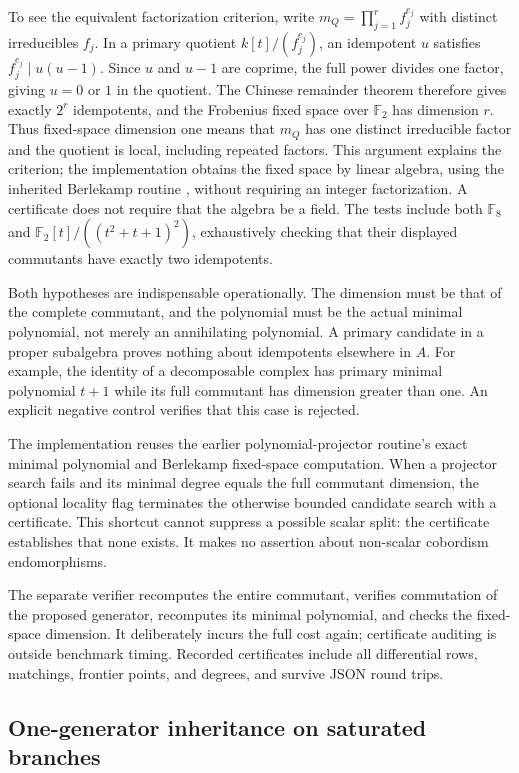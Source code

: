 To see the equivalent factorization criterion, write
$m_Q=\prod_{j=1}^r f_j^{e_j}$ with distinct irreducibles $f_j$.
In a primary quotient $k[t]/(f_j^{e_j})$, an idempotent $u$ satisfies
$f_j^{e_j}\mid u(u-1)$. Since $u$ and $u-1$ are coprime, the full
power divides one factor, giving $u=0$ or $1$ in the quotient.
The Chinese remainder theorem therefore gives exactly $2^r$ idempotents,
and the Frobenius fixed space over $\mathbb F_2$ has dimension $r$.
Thus fixed-space dimension one means that $m_Q$ has one distinct
irreducible factor and the quotient is local, including repeated factors.
This argument explains the criterion; the implementation obtains the
fixed space by linear algebra, using the inherited Berlekamp routine
\cite{berlekamp,projectors}, without requiring an integer factorization. A certificate
does not require that the algebra be a field. The tests include both
$\mathbb F_8$ and $\mathbb F_2[t]/((t^2+t+1)^2)$, exhaustively checking that
their displayed commutants have exactly two idempotents.

Both hypotheses are indispensable operationally. The dimension must be that
of the complete commutant, and the polynomial must be the actual minimal
polynomial, not merely an annihilating polynomial. A primary candidate in a
proper subalgebra proves nothing about idempotents elsewhere in $A$.
For example, the identity of a decomposable complex has primary minimal
polynomial $t+1$ while its full commutant has dimension greater than one.
An explicit negative control verifies that this case is rejected.

The implementation reuses the earlier polynomial-projector routine's exact
minimal polynomial and Berlekamp fixed-space computation. When a projector
search fails and its minimal degree equals the full commutant dimension,
the optional locality flag terminates the otherwise bounded candidate
search with a certificate. This shortcut cannot suppress a possible scalar
split: the certificate establishes that none exists. It makes no assertion
about non-scalar cobordism endomorphisms.

The separate verifier recomputes the entire commutant, verifies commutation
of the proposed generator, recomputes its minimal polynomial, and checks
the fixed-space dimension. It deliberately incurs the full cost again;
certificate auditing is outside benchmark timing. Recorded certificates
include all differential rows, matchings, frontier points, and degrees,
and survive JSON round trips.

\subsection{One-generator inheritance on saturated branches}

